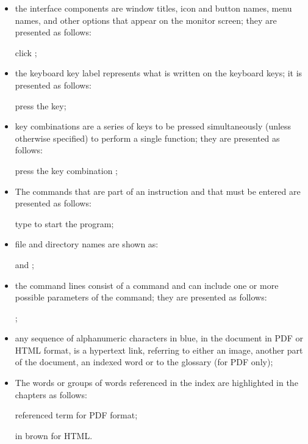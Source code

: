 \begin{itemize}

\item the interface components are window titles, icon and button names, menu names, and other options that appear on the monitor screen; they are presented as follows: \newline

\hspace {1.5cm} click ;

\item the keyboard key label represents what is written on the keyboard keys; it is presented as follows: \newline

\hspace {1.5cm} press the  key;

\item key combinations are a series of keys to be pressed simultaneously (unless otherwise specified) to perform a single function; they are presented as follows: \newline

\hspace {1.5cm} press the key combination  ;

\item The commands that are part of an instruction and that must be entered are presented as follows:\newline

\hspace {1.5cm} type  to start the program;

\item file and directory names are shown as: \newline

\hspace {1.5cm}  and ;

\item the command lines consist of a command and can include one or more possible parameters of the command; they are presented as follows: \newline

\hspace {1.5cm} ;

\item any sequence of alphanumeric characters in blue, in the document in PDF or HTML format, is a hypertext link, referring to either an image, another part of the document, an indexed word or to the glossary (for PDF only);

\item The words or groups of words referenced in the index are highlighted in the chapters as follows:\newline

\hspace {1.5cm} \textsf{referenced term} for PDF format; \newline

\hspace {1.5cm} in brown for HTML.

\end{itemize}

